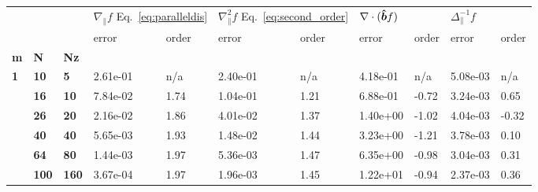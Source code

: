 \begin{tabular}{lllllllllll}
\toprule
  &     &     & \multicolumn{2}{l}{$\nabla_\parallel f$
  Eq.~\eqref{eq:paralleldis}} &
  \multicolumn{2}{l}{$\nabla_\parallel^2 f$ Eq.~\eqref{eq:second_order}} &
  \multicolumn{2}{l}{$\nabla\cdot(\bm{\hat{b}} f)$} &
  \multicolumn{2}{l}{$\Delta_\parallel^{-1}f $} \\
  &    &     &     error & order &     error & order &       error &  order &          error & order \\
\textbf{m} & \textbf{N} & \textbf{Nz} &           &       &           &       &             &        &                &       \\
\midrule
\textbf{1} & \textbf{10 } & \textbf{5  } &  2.61e-01 &   n/a &  2.40e-01 &   n/a &    4.18e-01 &    n/a &       5.08e-03 &   n/a \\
           & \textbf{16 } & \textbf{10 } &  7.84e-02 & 1.74  &  1.04e-01 & 1.21  &    6.88e-01 &  -0.72 &       3.24e-03 &  0.65 \\
           & \textbf{26} & \textbf{20 } &  2.16e-02 & 1.86  &  4.01e-02 & 1.37  &    1.40e+00 &  -1.02 &       4.04e-03 &  -0.32 \\
           & \textbf{40} & \textbf{40 } &  5.65e-03 & 1.93  &  1.48e-02 & 1.44  &    3.23e+00 &  -1.21 &       3.78e-03 &  0.10 \\
           & \textbf{64} & \textbf{80 } &  1.44e-03 & 1.97  &  5.36e-03 & 1.47  &    6.35e+00 &  -0.98 &       3.04e-03 &  0.31 \\
           & \textbf{100} & \textbf{160} &  3.67e-04 & 1.97  &  1.96e-03 & 1.45  &    1.22e+01 &  -0.94 &       2.37e-03 &  0.36 \\
\bottomrule
\end{tabular}
